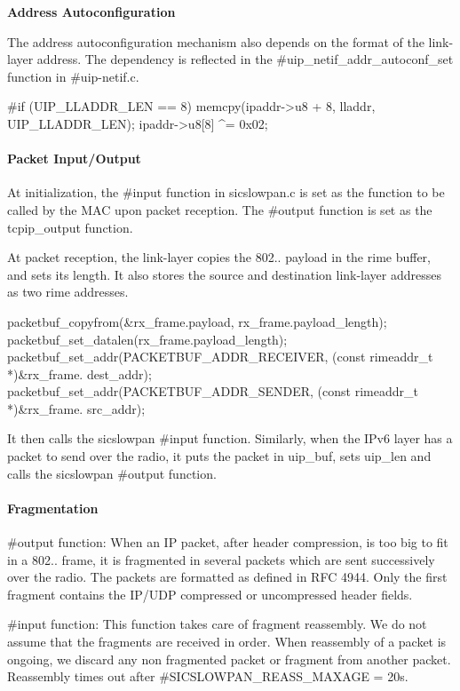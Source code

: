 {\bfseries \-Address \-Autoconfiguration}\par
 \-The address autoconfiguration mechanism also depends on the format of the link-\/layer address. \-The dependency is reflected in the \#uip\-\_\-netif\-\_\-addr\-\_\-autoconf\-\_\-set function in \#uip-\/netif.\-c. 
\begin{DoxyCode}
#if (UIP_LLADDR_LEN == 8)
  memcpy(ipaddr->u8 + 8, lladdr, UIP_LLADDR_LEN);
  ipaddr->u8[8] ^= 0x02;  
\end{DoxyCode}
\hypertarget{a00056_io}{}\paragraph{\-Packet Input/\-Output}\label{a00056_io}
\-At initialization, the \#input function in sicslowpan.\-c is set as the function to be called by the \-M\-A\-C upon packet reception. \-The \#output function is set as the tcpip\-\_\-output function.\par
 \-At packet reception, the link-\/layer copies the 802.. payload in the rime buffer, and sets its length. \-It also stores the source and destination link-\/layer addresses as two rime addresses. 
\begin{DoxyCode}
packetbuf_copyfrom(&rx_frame.payload, rx_frame.payload_length);
packetbuf_set_datalen(rx_frame.payload_length);
packetbuf_set_addr(PACKETBUF_ADDR_RECEIVER, (const rimeaddr_t *)&rx_frame.
      dest_addr); 
packetbuf_set_addr(PACKETBUF_ADDR_SENDER, (const rimeaddr_t *)&rx_frame.
      src_addr);
\end{DoxyCode}
 \-It then calls the sicslowpan \#input function. \-Similarly, when the \-I\-Pv6 layer has a packet to send over the radio, it puts the packet in uip\-\_\-buf, sets uip\-\_\-len and calls the sicslowpan \#output function.\hypertarget{a00056_frag}{}\paragraph{\-Fragmentation}\label{a00056_frag}
\begin{DoxyItemize}
\item \#output function\-: \-When an \-I\-P packet, after header compression, is too big to fit in a 802.. frame, it is fragmented in several packets which are sent successively over the radio. \-The packets are formatted as defined in \-R\-F\-C 4944. \-Only the first fragment contains the \-I\-P/\-U\-D\-P compressed or uncompressed header fields.\end{DoxyItemize}
\begin{DoxyItemize}
\item \#input function\-: \-This function takes care of fragment reassembly. \-We do not assume that the fragments are received in order. \-When reassembly of a packet is ongoing, we discard any non fragmented packet or fragment from another packet. \-Reassembly times out after \#\-S\-I\-C\-S\-L\-O\-W\-P\-A\-N\-\_\-\-R\-E\-A\-S\-S\-\_\-\-M\-A\-X\-A\-G\-E = 20s.\end{DoxyItemize}
